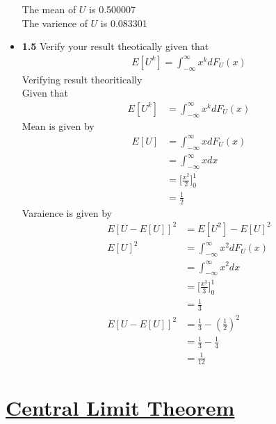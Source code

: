 \documentclass[journal,12pt,twocolumn]{IEEEtran}
\begin{document}
\begin{itemize}
    The mean of $U$ is 0.500007\\
    The varience of $U$ is 0.083301 \\
    \item \textbf{1.5} Verify your result theotically given that 
    \begin{align}
        E[U^k] = \int_{-\infty}^{\infty} x^k dF_U(x) 
    \end{align}
    \solution Verifying result theoritically\\
    Given that
    \begin{align}
        E[U^k] &= \int_{-\infty}^{\infty} x^k dF_U(x)
    \end{align}
    Mean is given by
    \begin{align}
        E[U] &= \int_{-\infty}^{\infty} x dF_U(x) \\
        &= \int_{-\infty}^{\infty} x dx \\
        &= \bigg[\frac{x^2}{2}\bigg]_0^1 \\
        &= \frac{1}{2}
    \end{align}
    Varaience is given by
    \begin{align}
        E[U-E[U]]^2 &= E[U^2] - E[U]^2 \\
        E[U]^2 &= \int_{-\infty}^{\infty} x^2 dF_U(x)\\
        &= \int_{-\infty}^{\infty} x^2 dx \\
        &= \bigg[\frac{x^3}{3}\bigg]_0^1 \\
        &= \frac{1}{3} \\
        E[U-E[U]]^2 &= \frac{1}{3} - (\frac{1}{2})^2 \\
        &= \frac{1}{3} - \frac{1}{4} \\
        &= \frac{1}{12}
    \end{align}
\end{itemize}

\section{\underline{Central Limit Theorem}}
\end{document}
